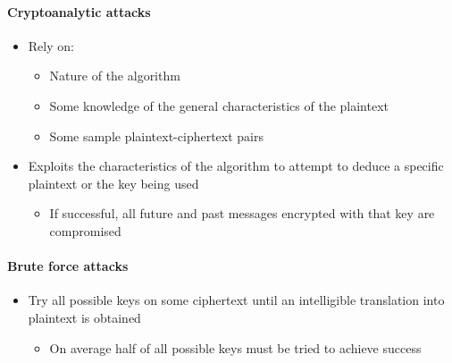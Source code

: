 \documentclass{article}
\begin{document}
                            \paragraph{Cryptoanalytic attacks}
                            \begin{itemize}
                                \item Rely on:
                                \begin{itemize}
                                    \item Nature of the algorithm
                                    \item Some knowledge of the general characteristics of the plaintext
                                    \item Some sample plaintext-ciphertext pairs
                                \end{itemize}
                            \item Exploits the characteristics of the algorithm to attempt to deduce a specific plaintext or the key being used
                                \begin{itemize}
                                      
                                    \item If successful, all future and past messages encrypted with that key are compromised
                                \end{itemize}
                            \end{itemize}
                            \paragraph{Brute force attacks}
                            \begin{itemize}
                            \item Try all possible keys on some ciphertext until an intelligible translation into plaintext is obtained
                            \begin{itemize}
                                \item On average half of all possible keys must be tried to achieve success
                            \end{itemize}

                            
                        \end{itemize}
                  
\end{document}
